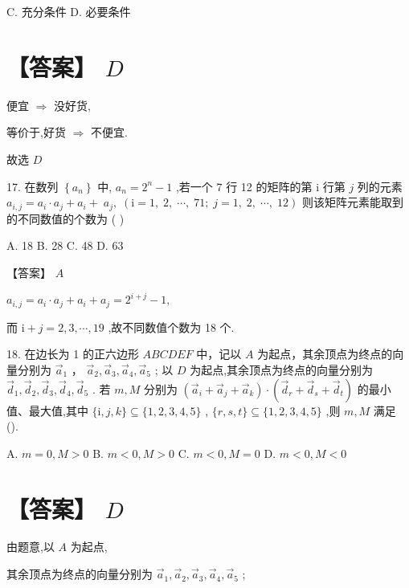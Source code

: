 \documentclass[10pt]{article}
\begin{document}
C. 充分条件 D. 必要条件

\section*{【答案】 \(D\)}

便宜 \(\Rightarrow\) 没好货,

等价于,好货 \(\Rightarrow\) 不便宜.

故选 \(D\)

17. 在数列 \(\left\{  {a}_{n}\right\}\) 中, \({a}_{n} = {2}^{n} - 1\) ,若一个 7 行 12 的矩阵的第 \(\mathrm{i}\) 行第 \(j\) 列的元素 \({a}_{i,j} = {a}_{i} \cdot  {a}_{j} + {a}_{i} + \; {a}_{j},\;\left( {\mathrm{i} = 1,\;2,\;\cdots ,\;{71};\;j = 1,\;2,\;\cdots ,\;{12}}\right)\) 则该矩阵元素能取到的不同数值的个数为 ( )

A. 18 B. 28 C. 48 D. 63

【答案】 \(A\)

\({a}_{i,j} = {a}_{i} \cdot  {a}_{j} + {a}_{i} + {a}_{j} = {2}^{i + j} - 1,\)

而 \(\mathrm{i} + j = 2,3,\cdots ,{19}\) ,故不同数值个数为 18 个.

18. 在边长为 1 的正六边形 \({ABCDEF}\) 中，记以 \(A\) 为起点，其余顶点为终点的向量分别为 \({\overrightarrow{a}}_{1}\) ， \({\overrightarrow{a}}_{2},{\overrightarrow{a}}_{3},{\overrightarrow{a}}_{4},{\overrightarrow{a}}_{5}\) ; 以 \(D\) 为起点,其余顶点为终点的向量分别为 \({\overrightarrow{d}}_{1},{\overrightarrow{d}}_{2},{\overrightarrow{d}}_{3},{\overrightarrow{d}}_{4},{\overrightarrow{d}}_{5}\) . 若 \(m,M\) 分别为 \(\left( {{\overrightarrow{a}}_{i} + {\overrightarrow{a}}_{j} + {\overrightarrow{a}}_{k}}\right)  \cdot  \left( {{\overrightarrow{d}}_{r} + {\overrightarrow{d}}_{s} + {\overrightarrow{d}}_{t}}\right)\) 的最小值、最大值,其中 \(\{ \mathrm{i},j,k\}  \subseteq  \{ 1,2,3,4,5\}\) , \(\{ r,s,t\}  \subseteq  \{ 1,2,3,4,5\}\) ,则 \(m,M\) 满足 ().

A. \(m = 0,M > 0\) B. \(m < 0,M > 0\) C. \(m < 0,M = 0\) D. \(m < 0,M < 0\)

\section*{【答案】 \(D\)}

由题意,以 \(A\) 为起点,

其余顶点为终点的向量分别为 \({\overrightarrow{a}}_{1},{\overrightarrow{a}}_{2},{\overrightarrow{a}}_{3},{\overrightarrow{a}}_{4},{\overrightarrow{a}}_{5}\) ;
\end{document}
